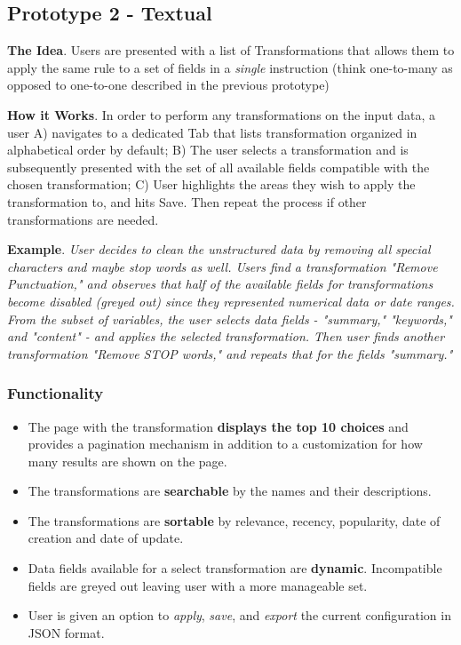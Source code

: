\documentclass[12pt,letterpaper]{article}
\begin{document}
\subsection*{Prototype 2 - Textual}

\textbf{The Idea}.
Users are presented with a list of Transformations that allows them to apply the same rule to a set of fields in a \textit{single} instruction (think one-to-many as opposed to one-to-one described in the previous prototype)

\textbf{How it Works}. In order to perform any transformations on the input data, a user A) navigates to a dedicated Tab that lists transformation organized in alphabetical order by default; B) The user selects a transformation and is subsequently presented with the set of all available fields compatible with the chosen transformation; C) User highlights the areas they wish to apply the transformation to, and hits Save. Then repeat the process if other transformations are needed.

\textbf{Example}. \textit{User decides to clean the unstructured data by removing all special characters and maybe stop words as well. Users find a transformation "Remove Punctuation," and observes that half of the available fields for transformations become disabled (greyed out) since they represented numerical data or date ranges. From the subset of variables, the user selects data fields - "summary," "keywords," and "content" - and applies the selected transformation. Then user finds another transformation "Remove STOP words," and repeats that for the fields "summary."}

\subsubsection*{Functionality}

\begin{itemize}
    \item The page with the transformation \textbf{displays the top 10 choices} and provides a pagination mechanism in addition to a customization for how many results are shown on the page.
    \item The transformations are \textbf{searchable} by the names and their descriptions. 
    \item The transformations are \textbf{sortable} by relevance, recency, popularity, date of creation and date of update.
    \item Data fields available for a select transformation are \textbf{dynamic}. Incompatible fields are greyed out leaving user with a more manageable set.
    \item User is given an option to \textit{apply}, \textit{save}, and \textit{export} the current configuration in JSON format.
\end{itemize}
\end{document}
